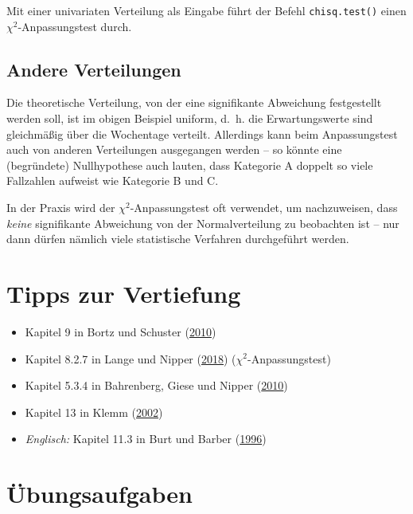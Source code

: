 \documentclass[
  11pt,
  ngerman,
  a4paper,
]{report}
\providecommand{\tightlist}{%
  \setlength{\itemsep}{0pt}\setlength{\parskip}{0pt}}
\newenvironment{rtip}{
  \medskip
  \begin{tcolorbox}[colframe=purple,colback=light_gray,title=Softwarehinweis]
}{
  \end{tcolorbox}
  \medskip
}
\begin{document}
\begin{rtip}
Mit einer univariaten Verteilung als Eingabe führt der Befehl \verb|chisq.test()| einen $\chi^2$-Anpassungstest durch.
\end{rtip}

\hypertarget{andere-verteilungen}{%
\subsection{Andere Verteilungen}\label{andere-verteilungen}}

Die theoretische Verteilung, von der eine signifikante Abweichung festgestellt werden soll, ist im obigen Beispiel uniform, d.~h. die Erwartungswerte sind gleichmäßig über die Wochentage verteilt.
Allerdings kann beim Anpassungstest auch von anderen Verteilungen ausgegangen werden -- so könnte eine (begründete) Nullhypothese auch lauten, dass Kategorie A doppelt so viele Fallzahlen aufweist wie Kategorie B und C.

In der Praxis wird der \(\chi^2\)-Anpassungstest oft verwendet, um nachzuweisen, dass \emph{keine} signifikante Abweichung von der Normalverteilung zu beobachten ist -- nur dann dürfen nämlich viele statistische Verfahren durchgeführt werden.

\hypertarget{tipps-zur-vertiefung-9}{%
\section*{Tipps zur Vertiefung}\label{tipps-zur-vertiefung-9}}

\begin{itemize}
\tightlist
\item
  Kapitel 9 in Bortz und Schuster (\protect\hyperlink{ref-bortz}{2010})
\item
  Kapitel 8.2.7 in Lange und Nipper (\protect\hyperlink{ref-delange}{2018}) (\(\chi^2\)-Anpassungstest)
\item
  Kapitel 5.3.4 in Bahrenberg, Giese und Nipper (\protect\hyperlink{ref-bahrenberg}{2010})
\item
  Kapitel 13 in Klemm (\protect\hyperlink{ref-klemm}{2002})
\item
  \emph{Englisch:} Kapitel 11.3 in Burt und Barber (\protect\hyperlink{ref-burt}{1996})
\end{itemize}

\hypertarget{uxfcbungsaufgaben-9}{%
\section*{Übungsaufgaben}\label{uxfcbungsaufgaben-9}}
\end{document}
